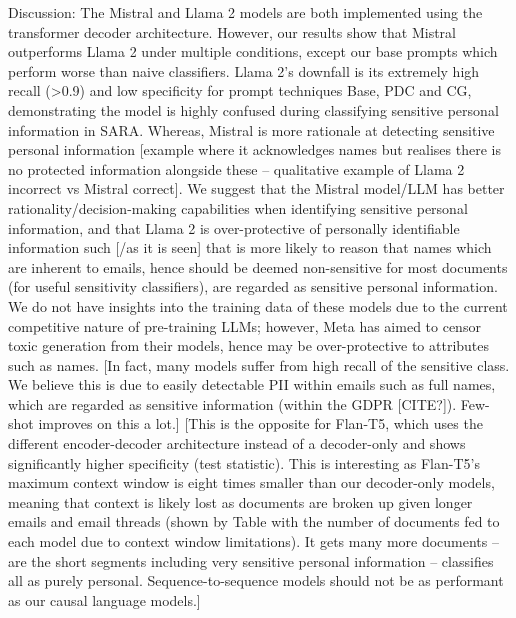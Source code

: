 Discussion:
The Mistral and Llama 2 models are both implemented using the transformer decoder architecture. However, our results show that Mistral outperforms Llama 2 under multiple conditions, except our base prompts which perform worse than naive classifiers. Llama 2’s downfall is its extremely high recall (>0.9) and low specificity for prompt techniques Base, PDC and CG, demonstrating the model is highly confused during classifying sensitive personal information in SARA. Whereas, Mistral is more rationale at detecting sensitive personal information [example where it acknowledges names but realises there is no protected information alongside these – qualitative example of Llama 2 incorrect vs Mistral correct]. We suggest that the Mistral model/LLM has better rationality/decision-making capabilities when identifying sensitive personal information, and that Llama 2 is over-protective of personally identifiable information such [/as it is seen] that is more likely to reason that names which are inherent to emails, hence should be deemed non-sensitive for most documents (for useful sensitivity classifiers), are regarded as sensitive personal information. We do not have insights into the training data of these models due to the current competitive nature of pre-training LLMs; however, Meta has aimed to censor toxic generation from their models, hence may be over-protective to attributes such as names.
[In fact, many models suffer from high recall of the sensitive class. We believe this is due to easily detectable PII within emails such as full names, which are regarded as sensitive information (within the GDPR [CITE?]). Few-shot improves on this a lot.] [This is the opposite for Flan-T5, which uses the different encoder-decoder architecture instead of a decoder-only and shows significantly higher specificity (test statistic). This is interesting as Flan-T5's maximum context window is eight times smaller than our decoder-only models, meaning that context is likely lost as documents are broken up given longer emails and email threads (shown by Table with the number of documents fed to each model due to context window limitations). It gets many more documents – are the short segments including very sensitive personal information – classifies all as purely personal. Sequence-to-sequence models should not be as performant as our causal language models.]


